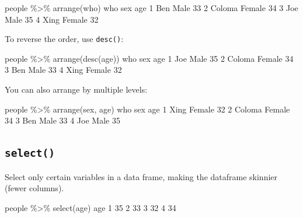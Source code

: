 \documentclass[
]{book}
\newenvironment{Shaded}{\begin{snugshade}}{\end{snugshade}}
\newcommand{\DecValTok}[1]{\textcolor[rgb]{0.00,0.00,0.81}{#1}}
\newcommand{\FunctionTok}[1]{\textcolor[rgb]{0.00,0.00,0.00}{#1}}
\newcommand{\NormalTok}[1]{#1}
\newcommand{\SpecialCharTok}[1]{\textcolor[rgb]{0.00,0.00,0.00}{#1}}
\begin{document}
\begin{Shaded}
\begin{Highlighting}[]
\NormalTok{people }\SpecialCharTok{\%\textgreater{}\%} \FunctionTok{arrange}\NormalTok{(who)}
\NormalTok{     who    sex age}
\DecValTok{1}\NormalTok{    Ben   Male  }\DecValTok{33}
\DecValTok{2}\NormalTok{ Coloma Female  }\DecValTok{34}
\DecValTok{3}\NormalTok{    Joe   Male  }\DecValTok{35}
\DecValTok{4}\NormalTok{   Xing Female  }\DecValTok{32}
\end{Highlighting}
\end{Shaded}

To reverse the order, use \texttt{desc()}:

\begin{Shaded}
\begin{Highlighting}[]
\NormalTok{people }\SpecialCharTok{\%\textgreater{}\%} \FunctionTok{arrange}\NormalTok{(}\FunctionTok{desc}\NormalTok{(age))}
\NormalTok{     who    sex age}
\DecValTok{1}\NormalTok{    Joe   Male  }\DecValTok{35}
\DecValTok{2}\NormalTok{ Coloma Female  }\DecValTok{34}
\DecValTok{3}\NormalTok{    Ben   Male  }\DecValTok{33}
\DecValTok{4}\NormalTok{   Xing Female  }\DecValTok{32}
\end{Highlighting}
\end{Shaded}

You can also arrange by multiple levels:

\begin{Shaded}
\begin{Highlighting}[]
\NormalTok{people }\SpecialCharTok{\%\textgreater{}\%} \FunctionTok{arrange}\NormalTok{(sex, age)}
\NormalTok{     who    sex age}
\DecValTok{1}\NormalTok{   Xing Female  }\DecValTok{32}
\DecValTok{2}\NormalTok{ Coloma Female  }\DecValTok{34}
\DecValTok{3}\NormalTok{    Ben   Male  }\DecValTok{33}
\DecValTok{4}\NormalTok{    Joe   Male  }\DecValTok{35}
\end{Highlighting}
\end{Shaded}

\hypertarget{select}{%
\subsection*{\texorpdfstring{\texttt{select()}}{select()}}\label{select}}

Select only certain variables in a data frame, making the dataframe skinnier (fewer columns).

\begin{Shaded}
\begin{Highlighting}[]
\NormalTok{people }\SpecialCharTok{\%\textgreater{}\%} \FunctionTok{select}\NormalTok{(age)}
\NormalTok{  age}
\DecValTok{1}  \DecValTok{35}
\DecValTok{2}  \DecValTok{33}
\DecValTok{3}  \DecValTok{32}
\DecValTok{4}  \DecValTok{34}
\end{Highlighting}
\end{Shaded}
\end{document}

